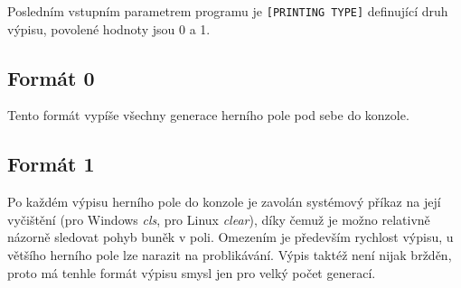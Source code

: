 Posledním vstupním parametrem programu je \texttt{[PRINTING TYPE]} definující druh výpisu, povolené hodnoty jsou 0 a 1.

\subsection{Formát 0}
Tento formát vypíše všechny generace herního pole pod sebe do konzole.

\subsection{Formát 1}
Po každém výpisu herního pole do konzole je zavolán systémový příkaz na její vyčištění (pro Windows \textit{cls}, pro Linux \textit{clear}), díky čemuž je možno relativně názorně sledovat pohyb buněk v poli. Omezením je především rychlost výpisu, u většího herního pole lze narazit na problikávání. Výpis taktéž není nijak bržděn, proto má tenhle formát výpisu smysl jen pro velký počet generací.

